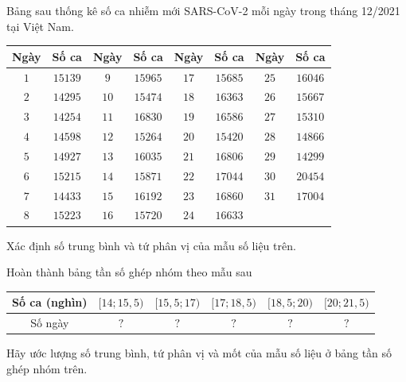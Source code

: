 \begin{ex}%
	Bảng sau thống kê số ca nhiễm mới SARS-CoV-2 mỗi  ngày trong tháng 12/2021 tại Việt Nam.
	\begin{center}
		\begin{tabular}{|c|c|c|c|c|c|c|c|}
			\hline Ngày  & Số ca & Ngày & Số ca & Ngày & Số ca & Ngày & Số ca \\
			\hline $1$ & $15139$ & $9$ & $15965$ & $17$  & $15685$ & $25$ & $16046$ \\
			\hline $2$ & $14295$ & $10$ & $15474$ & $18$ & $16363$ & $26$ & $15667$  \\
			\hline $3$ & $14254$ & $11$ & $16830$ &  $19$ & $16586$ & $27$ & $15310$ \\
			\hline $4$ & $14598$ & $12$ & $15264$ &  $20$ & $15420$ & $28$ & $14866$ \\
			\hline $5$ & $14927$ & $13$ & $16035$ & $21$ & $16806$ & $29$ & $14299$  \\
			\hline $6$ & $15215$ & $14$ & $15871$ & $22$ & $17044$ & $30$ &  $20454$ \\
			\hline $7$ & $14433$ & $15$ & $16192$ &  $23$ & $16860$ & $31$ & $17004$ \\
			\hline $8$  & $15223$ & $16$ & $15720$ & $24$ & $16633$ & & \\
			 \hline
		\end{tabular}
	\end{center}
	\begin{listEX}
		 \item Xác định số trung bình và tứ phân vị của mẫu số liệu trên.
		\item Hoàn thành bảng tần  số ghép nhóm theo mẫu sau
		\begin{center}
			\begin{tabular}{|c|c|c|c|c|c|}
				\hline Số ca (nghìn) & $[14;15{,}5)$ & $[15{,}5;17)$ & $[17;18{,}5)$ & $[18{,}5;20)$  & $[20;21{,}5)$ \\
				\hline Số ngày & $?$ & $?$ & $?$  & $?$ & $?$ \\
				\hline 
			\end{tabular}
		\end{center}
		\item Hãy ước lượng số trung bình, tứ phân vị và  mốt của mẫu số liệu ở bảng tần số ghép nhóm trên.
	\end{listEX}
\end{ex}
